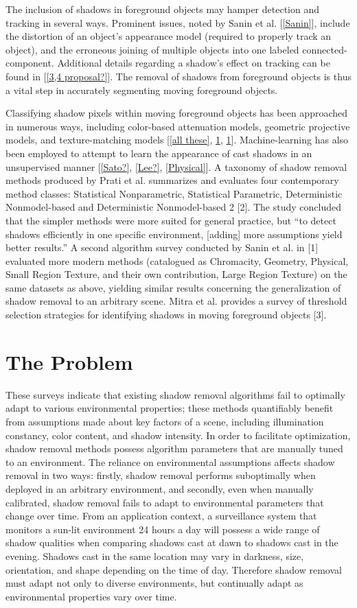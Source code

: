 The inclusion of shadows in foreground objects may hamper detection and tracking in several ways. Prominent issues, noted by Sanin et al. [\ref{Sanin}], include the distortion of an object's appearance model (required to properly track an object), and the erroneous joining of multiple objects into one labeled connected-component. Additional details regarding a shadow's effect on tracking can be found in [\ref{3,4 proposal?}]. The removal of shadows from foreground objects is thus a vital step in accurately segmenting moving foreground objects.

Classifying shadow pixels within moving foreground objects has been approached in numerous ways, including color-based attenuation models, geometric projective models, and texture-matching models [\ref{all these}, \ref{}, \ref{}]. Machine-learning has also been employed to attempt to learn the appearance of cast shadows in an unsupervised manner [\ref{Sato?}, \ref{Lee?}, \ref{Physical}]. A taxonomy of shadow removal methods produced by Prati et al. summarizes and evaluates four contemporary method classes: Statistical Nonparametric, Statistical Parametric, Deterministic Nonmodel-based and Deterministic Nonmodel-based 2 [2]. The study concluded that the simpler methods were more suited for general practice, but ``to detect shadows efficiently in one specific environment, [adding] more assumptions yield better results.'' A second algorithm survey conducted by Sanin et al. in [1] evaluated more modern methods (catalogued as Chromacity, Geometry, Physical, Small Region Texture, and their own contribution, Large Region Texture) on the same datasets as above, yielding similar results concerning the generalization of shadow removal to an arbitrary scene. Mitra et al. provides a survey of threshold selection strategies for identifying shadows in moving foreground objects [3].

\section{The Problem}

These surveys indicate that existing shadow removal algorithms fail to optimally adapt to various environmental properties; these methods quantifiably benefit from assumptions made about key factors of a scene, including illumination constancy, color content, and shadow intensity. In order to facilitate optimization, shadow removal methods possess algorithm parameters that are manually tuned to an environment. The reliance on environmental assumptions affects shadow removal in two ways: firstly, shadow removal performs suboptimally when deployed in an arbitrary environment, and secondly, even when manually calibrated, shadow removal fails to adapt to environmental parameters that change over time. From an application context, a surveillance system that monitors a sun-lit environment 24 hours a day will possess a wide range of shadow qualities when comparing shadows cast at dawn to shadows cast in the evening. Shadows cast in the same location may vary in darkness, size, orientation, and shape depending on the time of day. Therefore shadow removal must adapt not only to diverse environments, but continually adapt as environmental properties vary over time.

